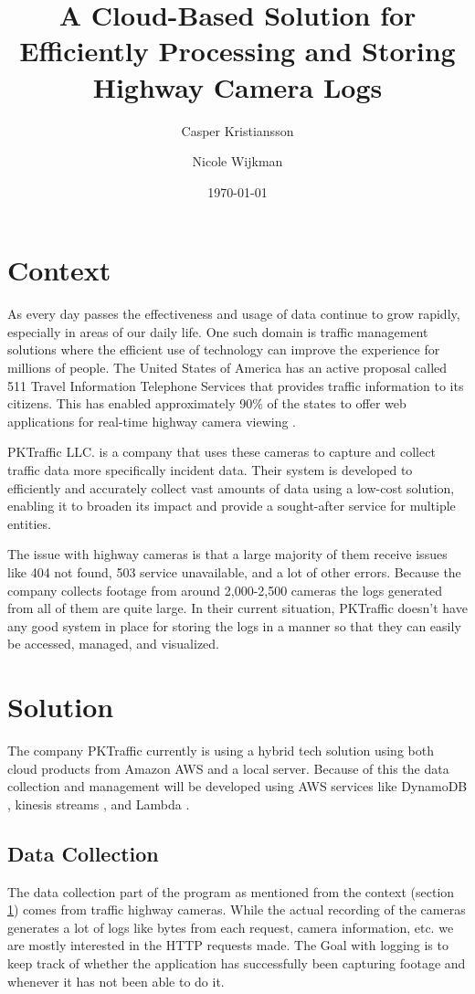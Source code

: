 \documentclass[12pt]{article}
\title{A Cloud-Based Solution for Efficiently Processing and Storing Highway Camera Logs}
\author{Casper Kristiansson \and Nicole Wijkman}
\date{\today}
\begin{document}
\maketitle

\section{Context}\label{context}
As every day passes the effectiveness and usage of data continue to grow rapidly, especially in areas of our daily life. One such domain is traffic management solutions where the efficient use of technology can improve the experience for millions of people. The United States of America has an active proposal called 511 Travel Information Telephone Services \cite{dotFHWATravel} that provides traffic information to its citizens. This has enabled approximately 90\% of the states to offer web applications for real-time highway camera viewing \cite{fl511FL511}.

PKTraffic LLC. \cite{pktrafficPKTraffic} is a company that uses these cameras to capture and collect traffic data more specifically incident data. Their system is developed to efficiently and accurately collect vast amounts of data using a low-cost solution, enabling it to broaden its impact and provide a sought-after service for multiple entities.

The issue with highway cameras is that a large majority of them receive issues like 404 not found, 503 service unavailable, and a lot of other errors. Because the company collects footage from around 2,000-2,500 cameras the logs generated from all of them are quite large. In their current situation, PKTraffic doesn't have any good system in place for storing the logs in a manner so that they can easily be accessed, managed, and visualized.

\section{Solution}
The company PKTraffic currently is using a hybrid tech solution using both cloud products from Amazon AWS  \cite{CloudSer68:online} and a local server. Because of this the data collection and management will be developed using AWS services like DynamoDB \cite{FastNoSQ49:online}, kinesis streams \cite{Processa96:online}, and Lambda \cite{Serverle45:online}.

\subsection{Data Collection}
The data collection part of the program as mentioned from the context (section  \ref{context}) comes from traffic highway cameras. While the actual recording of the cameras generates a lot of logs like bytes from each request, camera information, etc. we are mostly interested in the HTTP requests made. The Goal with logging is to keep track of whether the application has successfully been capturing footage and whenever it has not been able to do it.
\end{document}
